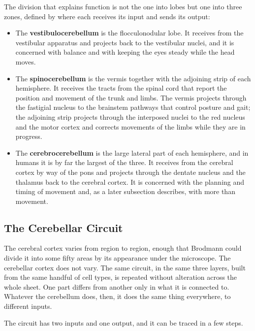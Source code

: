 \documentclass[11pt]{article}
\begin{document}
The division that explains function is not the one into lobes but one into three zones, defined by where each receives its input and sends its output:

\begin{itemize}
    \item The \textbf{vestibulocerebellum} is the flocculonodular lobe. It receives from the vestibular apparatus and projects back to the vestibular nuclei, and it is concerned with balance and with keeping the eyes steady while the head moves.
    \item The \textbf{spinocerebellum} is the vermis together with the adjoining strip of each hemisphere. It receives the tracts from the spinal cord that report the position and movement of the trunk and limbs. The vermis projects through the fastigial nucleus to the brainstem pathways that control posture and gait; the adjoining strip projects through the interposed nuclei to the red nucleus and the motor cortex and corrects movements of the limbs while they are in progress.
    \item The \textbf{cerebrocerebellum} is the large lateral part of each hemisphere, and in humans it is by far the largest of the three. It receives from the cerebral cortex by way of the pons and projects through the dentate nucleus and the thalamus back to the cerebral cortex. It is concerned with the planning and timing of movement and, as a later subsection describes, with more than movement.
\end{itemize}

\subsection{The Cerebellar Circuit}

The cerebral cortex varies from region to region, enough that Brodmann could divide it into some fifty areas by its appearance under the microscope. The cerebellar cortex does not vary. The same circuit, in the same three layers, built from the same handful of cell types, is repeated without alteration across the whole sheet. One part differs from another only in what it is connected to. Whatever the cerebellum does, then, it does the same thing everywhere, to different inputs.

The circuit has two inputs and one output, and it can be traced in a few steps.
\end{document}
